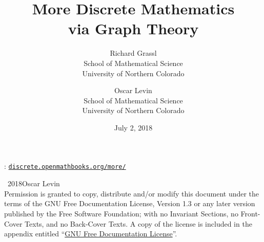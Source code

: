\documentclass[10pt,]{book}
\title{More Discrete Mathematics\\
{\large via Graph Theory}}
\author{Richard Grassl\\
School of Mathematical Science\\
University of Northern Colorado
\and
Oscar Levin\\
School of Mathematical Science\\
University of Northern Colorado
}
\date{July 2, 2018}
\newcommand{\mono}[1]{\texttt{#1}}
\theoremstyle{plain}
\theoremstyle{definition}
\theoremstyle{definition}
\theoremstyle{definition}
\numberwithin{equation}{chapter}
\begin{document}
\frontmatter

\thispagestyle{empty}
\hypertarget{colophon-1}{}
: \href{http://discrete.openmathbooks.org/more/}{\mono{discrete.openmathbooks.org/more/}}\par\medskip
\noindent\textcopyright\ 2018\quad{}Oscar Levin\\[0.5\baselineskip]
Permission is granted to copy, distribute and/or modify this document under the terms of the GNU Free Documentation License, Version 1.3 or any later version published by the Free Software Foundation; with no Invariant Sections, no Front-Cover Texts, and no Back-Cover Texts.  A copy of the license is included in the appendix entitled ``\hyperref[appendix-gfdl]{GNU Free Documentation License}''.\par\medskip
{}
\null\clearpage
\end{document}
